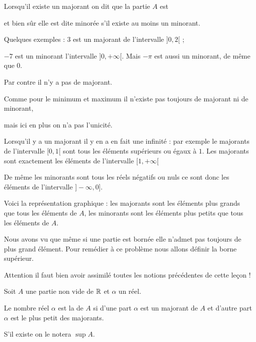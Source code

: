\change

Lorsqu'il existe un majorant on dit que la partie $A$ est  

et bien sûr elle est dite minorée s'il existe au moins un minorant.

\change

Quelques exemples :
 $3$ est un majorant de l'intervalle $]0,2[$ ;

\change

 $-7$ est un minorant l'intervalle  $]0,+\infty[$. Mais $-\pi$ est aussi un minorant, de même que $0$.

Par contre il n'y a pas de majorant.



Comme pour le minimum et maximum il n'existe pas toujours de majorant ni de minorant, 

mais ici en plus on n'a pas l'unicité.

\change

Lorsqu'il y a un majorant il y en a en fait une infinité :
par exemple le majorants de l'intervalle $[0,1[$ sont tous les éléments
supérieurs ou égaux à $1$. Les majorants sont exactement les éléments de l'intervalle $[1,+\infty[$

\change

De même les minorants sont tous les réels négatifs ou nuls ce sont donc les éléments de l'intervalle
 $]-\infty,0]$.

\change

Voici la représentation graphique : les majorants sont les éléments plus grands que tous les éléments de $A$,
les minorants sont les éléments plus petits que tous les éléments de $A$.

\diapo


Nous avons vu que même si une partie est bornée elle n'admet pas toujours de plus grand élément.
Pour remédier à ce problème nous allons définir la borne supérieur. 

Attention il faut bien avoir assimilé toutes les notions précédentes de cette leçon !

Soit $A$ une partie non vide de $\mathbb{R}$ et $\alpha$ un réel.

Le nombre réel $\alpha$ est la  de $A$ si d'une part $\alpha$ est un majorant de $A$ et 
d'autre part $\alpha$ est le plus petit des majorants. 

S'il existe on le notera $\sup A$.

\change

